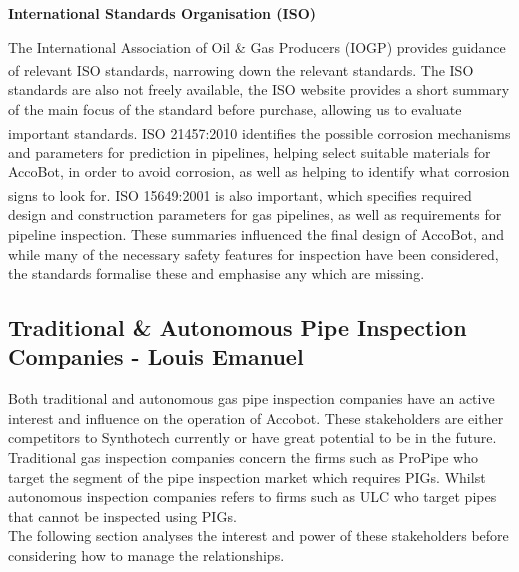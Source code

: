 \documentclass[11pt]{article}		%
\newcommand{\supercite}[1]{\textsuperscript{\cite{#1}}}		%
\begin{document}
			\textbf{International Standards Organisation (ISO)}
			
			The International Association of Oil \& Gas Producers (IOGP) provides guidance of relevant ISO standards\supercite{iogp2017standards}, narrowing down the relevant standards.
			The ISO standards are also not freely available, the ISO website provides a short summary of the main focus of the standard before purchase, allowing us to evaluate important standards.
			ISO 21457:2010\supercite{iso21457} identifies the possible corrosion mechanisms and parameters for prediction in pipelines, helping select suitable materials for AccoBot, in order to avoid corrosion, as well as helping to identify what corrosion signs to look for.
			ISO 15649:2001\supercite{iso15649} is also important, which specifies required design and construction parameters for gas pipelines, as well as requirements for pipeline inspection.
			These summaries influenced the final design of AccoBot, and while many of the necessary safety features for inspection have been considered, the standards formalise these and emphasise any which are missing.
		
		\subsection[Traditional \& Autonomous Pipe Inspection Companies]{Traditional \& Autonomous Pipe Inspection Companies - Louis Emanuel}
            Both traditional and autonomous gas pipe inspection companies have an active interest and influence on the operation of Accobot. These stakeholders are either competitors to Synthotech currently or have great potential to be in the future. Traditional gas inspection companies concern the firms such as ProPipe who target the segment of the pipe inspection market which requires PIGs. Whilst autonomous inspection companies refers to firms such as ULC who target pipes that cannot be inspected using PIGs. \\
            \hspace*{3ex}The following section analyses the interest and power of these stakeholders before considering how to manage the relationships.
            
\end{document}
